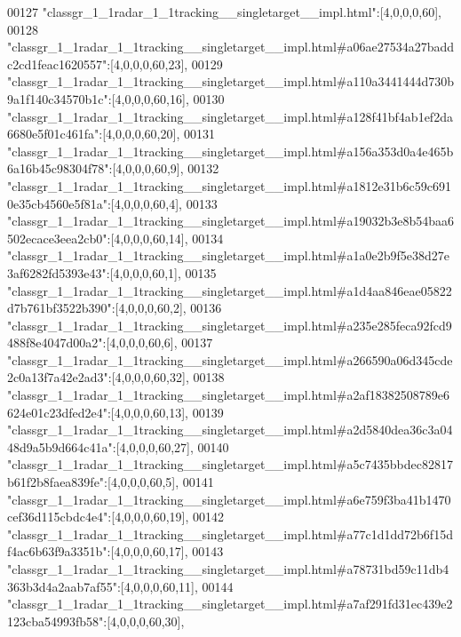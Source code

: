 \begin{DoxyCode}
00127 \textcolor{stringliteral}{"classgr\_1\_1radar\_1\_1tracking\_\_singletarget\_\_impl.html"}:[4,0,0,0,60],
00128 \textcolor{stringliteral}{"classgr\_1\_1radar\_1\_1tracking\_\_singletarget\_\_impl.html#a06ae27534a27baddc2cd1feac1620557"}:[4,0,0,0,60,23],
00129 \textcolor{stringliteral}{"classgr\_1\_1radar\_1\_1tracking\_\_singletarget\_\_impl.html#a110a3441444d730b9a1f140c34570b1c"}:[4,0,0,0,60,16],
00130 \textcolor{stringliteral}{"classgr\_1\_1radar\_1\_1tracking\_\_singletarget\_\_impl.html#a128f41bf4ab1ef2da6680e5f01c461fa"}:[4,0,0,0,60,20],
00131 \textcolor{stringliteral}{"classgr\_1\_1radar\_1\_1tracking\_\_singletarget\_\_impl.html#a156a353d0a4e465b6a16b45c98304f78"}:[4,0,0,0,60,9],
00132 \textcolor{stringliteral}{"classgr\_1\_1radar\_1\_1tracking\_\_singletarget\_\_impl.html#a1812e31b6c59c6910e35cb4560e5f81a"}:[4,0,0,0,60,4],
00133 \textcolor{stringliteral}{"classgr\_1\_1radar\_1\_1tracking\_\_singletarget\_\_impl.html#a19032b3e8b54baa6502ecace3eea2cb0"}:[4,0,0,0,60,14],
00134 \textcolor{stringliteral}{"classgr\_1\_1radar\_1\_1tracking\_\_singletarget\_\_impl.html#a1a0e2b9f5e38d27e3af6282fd5393e43"}:[4,0,0,0,60,1],
00135 \textcolor{stringliteral}{"classgr\_1\_1radar\_1\_1tracking\_\_singletarget\_\_impl.html#a1d4aa846eae05822d7b761bf3522b390"}:[4,0,0,0,60,2],
00136 \textcolor{stringliteral}{"classgr\_1\_1radar\_1\_1tracking\_\_singletarget\_\_impl.html#a235e285feca92fcd9488f8e4047d00a2"}:[4,0,0,0,60,6],
00137 \textcolor{stringliteral}{"classgr\_1\_1radar\_1\_1tracking\_\_singletarget\_\_impl.html#a266590a06d345cde2c0a13f7a42e2ad3"}:[4,0,0,0,60,32],
00138 \textcolor{stringliteral}{"classgr\_1\_1radar\_1\_1tracking\_\_singletarget\_\_impl.html#a2af18382508789e6624e01c23dfed2e4"}:[4,0,0,0,60,13],
00139 \textcolor{stringliteral}{"classgr\_1\_1radar\_1\_1tracking\_\_singletarget\_\_impl.html#a2d5840dea36c3a0448d9a5b9d664c41a"}:[4,0,0,0,60,27],
00140 \textcolor{stringliteral}{"classgr\_1\_1radar\_1\_1tracking\_\_singletarget\_\_impl.html#a5c7435bbdec82817b61f2b8faea839fe"}:[4,0,0,0,60,5],
00141 \textcolor{stringliteral}{"classgr\_1\_1radar\_1\_1tracking\_\_singletarget\_\_impl.html#a6e759f3ba41b1470cef36d115cbdc4e4"}:[4,0,0,0,60,19],
00142 \textcolor{stringliteral}{"classgr\_1\_1radar\_1\_1tracking\_\_singletarget\_\_impl.html#a77c1d1dd72b6f15df4ac6b63f9a3351b"}:[4,0,0,0,60,17],
00143 \textcolor{stringliteral}{"classgr\_1\_1radar\_1\_1tracking\_\_singletarget\_\_impl.html#a78731bd59c11db4363b3d4a2aab7af55"}:[4,0,0,0,60,11],
00144 \textcolor{stringliteral}{"classgr\_1\_1radar\_1\_1tracking\_\_singletarget\_\_impl.html#a7af291fd31ec439e2123cba54993fb58"}:[4,0,0,0,60,30],

\end{DoxyCode}

